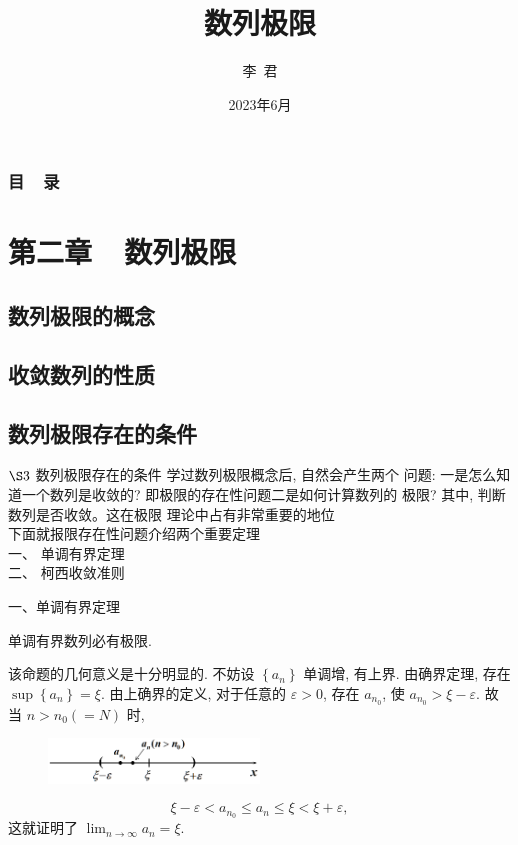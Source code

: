 \documentclass[t,12pt,mathserif] {beamer}
\title[数列极限]{数列极限}
\institute[]{天津师范大学，数学科学学院}
\author[Jun Li]{
	李~君 }
\date{2023年6月}
\begin{document}
\begin{frame}%
\maketitle
\end{frame}

\begin{frame}
\frametitle{目~~录}
\tableofcontents
\end{frame}

\setcounter{section}{1}
\section{第二章~~数列极限}

\subsection{数列极限的概念}
\subsection{收敛数列的性质}
\subsection{数列极限存在的条件}
\begin{frame}{$\S 3$  数列极限存在的条件}
 \alert{学过数列极限概念后, 自然会产生两个 问题: 一是怎么知道一个数列是收敛的? 即极限的存在性问题二是如何计算数列的 极限? 其中, 判断数列是否收敛。这在极限 理论中占有非常重要的地位\\ 下面就报限存在性问题介绍两个重要定理}\\
一、 单调有界定理\\
二、 柯西收敛准则
\end{frame}


\begin{frame}{  一、单调有界定理}%
\setcounter{thm}{6}
\begin{thm}
单调有界数列必有极限.
\end{thm}
\zheng 该命题的几何意义是十分明显的.
不妨设 $\left\{a_n\right\}$ 单调增, 有上界. 由确界定理, 存在 $\sup \left\{a_n\right\}=\xi$. 由上确界的定义, 对于任意的 $\varepsilon>0$, 存在 $a_{n_0}$, 使 $a_{n_0}>\xi-\varepsilon$. 故当 $n>n_0(=N)$ 时,  
\begin{figure}
\vspace{-0.85\baselineskip}
\includegraphics[width=0.5\textwidth]{figures/ddyoujie1.png}
\vspace{-0.85\baselineskip}
\end{figure}

$$
\xi-\varepsilon<a_{n_0} \leq a_n \leq \xi<\xi+\varepsilon,
$$
这就证明了 $\lim _{n \rightarrow \infty} a_n=\xi$.


\end{frame}
\end{document}
